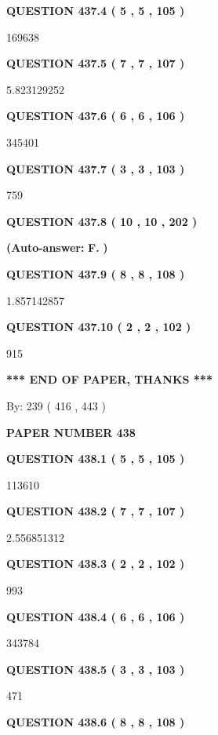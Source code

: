 \documentclass{ctexart}
\begin{document}
  
{\textbf{\large{QUESTION
437.4 
 ( 5 , 5 , 105 )
}}}

169638
  
  
{\textbf{\large{QUESTION
437.5 
 ( 7 , 7 , 107 )
}}}

5.823129252
  
  
{\textbf{\large{QUESTION
437.6 
 ( 6 , 6 , 106 )
}}}

345401
  
  
{\textbf{\large{QUESTION
437.7 
 ( 3 , 3 , 103 )
}}}

759
  
  
{\textbf{\large{QUESTION
437.8 
 ( 10 , 10 , 202 )
}}}
 
 
{\textbf{(Auto-answer:}}
{\textbf{\large{
F.}}}
{\textbf{)}}
 
 
  
  
{\textbf{\large{QUESTION
437.9 
 ( 8 , 8 , 108 )
}}}

1.857142857
  
  
{\textbf{\large{QUESTION
437.10 
 ( 2 , 2 , 102 )
}}}

915
   
   
   
   
\vspace{1.0in} 
{\textbf{\large{ *** END OF PAPER, THANKS *** }}} 
   
   
\hspace{1.0in} By: 
 239 ( 416 ,  443 )
   
   
   
   
\newpage 
\setcounter{page}{ 
   438001 } 
   
   
 {\textbf{ \Large{ PAPER NUMBER  438  }}}
   
   
   
   
  
  
{\textbf{\large{QUESTION
438.1 
 ( 5 , 5 , 105 )
}}}

113610
  
  
{\textbf{\large{QUESTION
438.2 
 ( 7 , 7 , 107 )
}}}

2.556851312
  
  
{\textbf{\large{QUESTION
438.3 
 ( 2 , 2 , 102 )
}}}

993
  
  
{\textbf{\large{QUESTION
438.4 
 ( 6 , 6 , 106 )
}}}

343784
  
  
{\textbf{\large{QUESTION
438.5 
 ( 3 , 3 , 103 )
}}}

471
  
  
{\textbf{\large{QUESTION
438.6 
 ( 8 , 8 , 108 )
}}}
\end{document}
